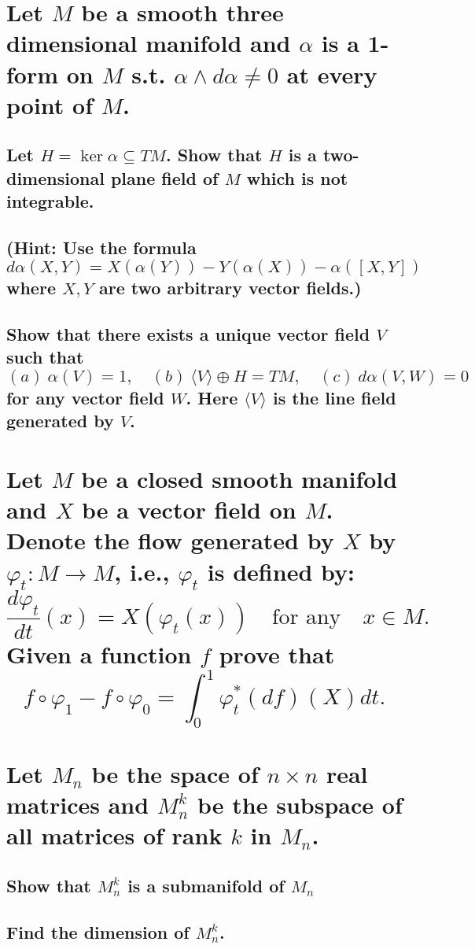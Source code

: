 \documentclass[10pt]{article}
\newcommand{\hint}[1]{(Hint: #1)}
\begin{document}
 

\section{Let $M$ be a smooth three dimensional manifold and $\alpha$ is a 1-form on $M$ s.t. $\alpha
\wedge d \alpha \neq 0$ at every point of $M$.}

\subsection{Let $H = \ker \alpha \subseteq TM$. Show that $H$ is a two-dimensional plane field of
  $M$ which is not integrable. \\\\\hint{Use the formula $d\alpha(X,Y) =
    X(\alpha(Y))-Y(\alpha(X))-\alpha([X,Y])$ where $X,Y$ are two arbitrary vector fields.}}

\subsection{Show that there exists a unique vector field $V$ such that 
$$(a)\ \alpha(V) =1, \quad (b)\ \langle V \rangle \oplus H = TM ,  \quad (c)\ d\alpha(V,W) =0$$
for any vector field $W$. Here $\langle V \rangle$ is the line field generated by $V$.}

\section{Let $M$ be a closed smooth manifold and $X$ be a vector field on $M$. Denote the flow
  generated by $X$ by $\varphi_t: M \to M$, i.e., $\varphi_t$ is defined by:
$$\frac{d \varphi_t}{dt}(x) = X( \varphi_t (x))\quad\mbox{for any}\quad x \in M. $$
Given a function $f$ prove that
$$f \circ \varphi_1 - f \circ \varphi_0 = \int_0^1 \varphi^*_t(df)(X)dt. $$}

\section{Let $M_n$ be the space of $n \times n$ real matrices and $M^k_n$ be the subspace of all
  matrices of rank $k$ in $M_n$.}

\subsection{Show that $M^k_n$ is a submanifold of $M_n$}

\subsection{Find the dimension of $M^k_n$.}
\end{document}

